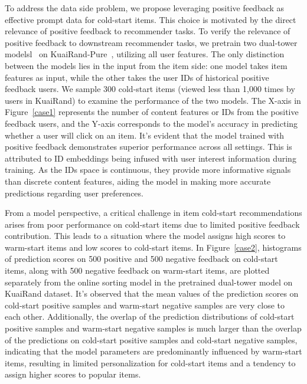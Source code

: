 \documentclass[sigconf]{acmart}
\begin{document}
To address the data side problem, we propose leveraging positive feedback as effective prompt data for cold-start items.
This choice is motivated by the direct relevance of positive feedback to recommender tasks.
To verify the relevance of positive feedback to downstream recommender tasks, we pretrain two dual-tower modelsl~\cite{huang2013learning} on KuaiRand-Pure~\cite{gao2022kuairand}, utilizing all user features.
The only distinction between the models lies in the input from the item side: one model takes item features as input, while the other takes the user IDs of historical positive feedback users. 
We sample 300 cold-start items (viewed less than 1,000 times by users in KuaiRand) to examine the performance of the two models. 
The X-axis in Figure~\ref{case1} represents the number of content features or IDs from the positive feedback users, and the Y-axis corresponds to the model's accuracy in predicting whether a user will click on an item. 
It's evident that the model trained with positive feedback demonstrates superior performance across all settings. 
This is attributed to ID embeddings being infused with user interest information during training. 
As the IDs space is continuous, they provide more informative signals than discrete content features, aiding the model in making more accurate predictions regarding user preferences.

From a model perspective, a critical challenge in item cold-start recommendations arises from poor performance on cold-start items due to limited positive feedback contribution. 
This leads to a situation where the model assigns high scores to warm-start items and low scores to cold-start items. 
In Figure~\ref{case2}, histograms of prediction scores on 500 positive and 500 negative feedback on cold-start items, along with 500 negative feedback on warm-start items, are plotted separately from the online sorting model in the pretrained dual-tower model on KuaiRand dataset. 
It's observed that the mean values of the prediction scores on cold-start positive samples and warm-start negative samples are very close to each other. 
Additionally, the overlap of the prediction distributions of cold-start positive samples and warm-start negative samples is much larger than the overlap of the predictions on cold-start positive samples and cold-start negative samples, indicating that the model parameters are predominantly influenced by warm-start items, resulting in limited personalization for cold-start items and a tendency to assign higher scores to popular items.
\end{document}
